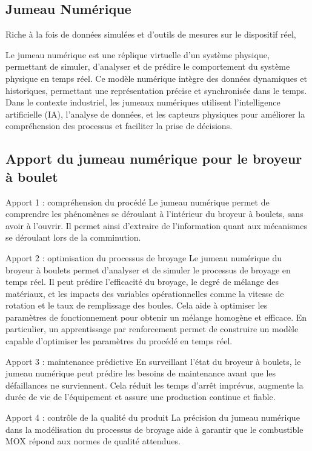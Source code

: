 

\subsection{Jumeau Numérique}

Riche à la fois de données simulées et d'outils de mesures sur le dispositif réel,

Le jumeau numérique est une réplique virtuelle d'un système physique, permettant de simuler, d'analyser et de prédire le comportement du système physique en temps réel. Ce modèle numérique intègre des données dynamiques et historiques, permettant une représentation précise et synchronisée dans le temps. Dans le contexte industriel, les jumeaux numériques utilisent l'intelligence artificielle (IA), l'analyse de données, et les capteurs physiques pour améliorer la compréhension des processus et faciliter la prise de décisions.

\subsection{Apport du jumeau numérique pour le broyeur à boulet}
Apport 1 : compréhension du procédé
Le jumeau numérique permet de comprendre les phénomènes se déroulant à l'intérieur du broyeur à boulets, sans avoir à l'ouvrir. Il permet ainsi d'extraire de l'information quant aux mécanismes se déroulant lors de la comminution.

Apport 2 : optimisation du processus de broyage
Le jumeau numérique du broyeur à boulets permet d'analyser et de simuler le processus de broyage en temps réel. Il peut prédire l'efficacité du broyage, le degré de mélange des matériaux, et les impacts des variables opérationnelles comme la vitesse de rotation et le taux de remplissage des boules. Cela aide à optimiser les paramètres de fonctionnement pour obtenir un mélange homogène et efficace. En particulier, un apprentissage par renforcement permet de construire un modèle capable d'optimiser les paramètres du procédé en temps réel.

Apport 3 : maintenance prédictive
En surveillant l'état du broyeur à boulets, le jumeau numérique peut prédire les besoins de maintenance avant que les défaillances ne surviennent. Cela réduit les temps d'arrêt imprévus, augmente la durée de vie de l'équipement et assure une production continue et fiable.

Apport 4 : contrôle de la qualité du produit
La précision du jumeau numérique dans la modélisation du processus de broyage aide à garantir que le combustible MOX répond aux normes de qualité attendues.

